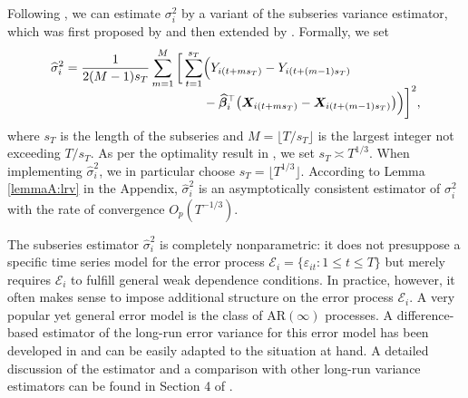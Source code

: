 \documentclass[a4paper,12pt]{article}
\begin{document}
Following \cite{Kim2016}, we can estimate $\sigma_i^2$ by a variant of the subseries variance estimator, which was first proposed by \cite{Carlstein1986} and then extended by \cite{WuZhao2007}. Formally, we set
\begin{align}
\widehat{\sigma}_i^2 = \frac{1}{2(M-1)s_T}\sum_{m=1}^M \bigg[ \sum_{t = 1}^{s_T} & \Big(Y_{i(t + ms_T)} - Y_{i(t + (m-1)s_T)} \nonumber \\[-0.2cm] & - \widehat{\bm{\beta}}_i^\top\big(\boldsymbol{X}_{i(t+ms_T)} - \boldsymbol{X}_{i(t+(m-1)s_T)}\big) \Big)\bigg]^2, \label{eq:lrv}
\end{align}
where $s_T$ is the length of the subseries and $M = \lfloor T/s_T\rfloor$ is the largest integer not exceeding $T/s_T$. As per the optimality result in \cite{Carlstein1986}, we set $s_T \asymp T^{1/3}$.  When implementing $\widehat{\sigma}_i^2$, we in particular choose $s_T = \lfloor T^{1/3}\rfloor$. According to  Lemma \ref{lemmaA:lrv} in the Appendix, $\widehat{\sigma}_i^2$ is an asymptotically consistent estimator of $\sigma_i^2$ with the rate of convergence $O_p(T^{-1/3})$. 


The subseries estimator $\widehat{\sigma}_i^2$ is completely nonparametric: it does not presuppose a specific time series model for the error process $\mathcal{E}_i = \{ \varepsilon_{it}: 1 \le t \le T\}$ but merely requires $\mathcal{E}_i$ to fulfill general weak dependence conditions. In practice, however, it often makes sense to impose additional structure on the error process $\mathcal{E}_i$. A very popular yet general error model is the class of $\text{AR}(\infty)$ processes. %
A difference-based estimator of the long-run error variance for this error model has been developed in \cite{KhismatullinaVogt2020} and can be easily adapted to the situation at hand. A detailed discussion of the estimator and a comparison with other long-run variance estimators can be found in Section 4 of \cite{KhismatullinaVogt2020}. 
\end{document}
